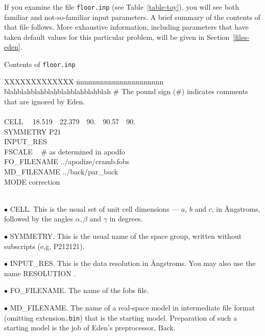 \documentclass{report}
\begin{document}
If you examine the file {\tt floor.inp} (see Table~\ref{table-toy}), 
you will see both familiar and
not-so-familiar input parameters.  A brief summary of the
contents of that file follows.  More exhaustive information, 
including parameters that have taken default
values for this particular problem, will be given in Section~\ref{files-eden}.

\begin{table} [htb]
\caption {\large Contents of {\tt floor.inp}}
\label{table-toy}

\begin{tabbing}
XXXXXXXXXXXXX \= nnnnnnnnnnnnnnnnnnnnnn \=
blahblahblahblahblahblahblahblah \kill
\#  The pound sign (\#) indicates comments that are ignored by Eden. \\
\\
CELL ~~18.519~~22.379~~90.~~90.57~~90. \\
SYMMETRY \> P21 \\
INPUT\_RES  \\
FSCALE       ~	\# as determined in apodfo \\
FO\_FILENAME \> ../apodize/cramb.fobs  \\
MD\_FILENAME \> ../back/par\_back  \\
MODE \> correction \\
\\
\end{tabbing} 
\end{table}

\vspace {0.1in}

$\bullet$ CELL. This is the usual set 
of unit cell dimensions --- $a$, $b$ and 
$c$, in \AA ngstroms, followed by the angles $\alpha, \beta$ 
and $\gamma$ in degrees.  

$\bullet$ SYMMETRY.
This is the usual name of the space group, written without subscripts (e,g,
P212121).

$\bullet$ INPUT\_RES.  
This is the data 
resolution in \AA ngstroms.  You may also use the name
RESOLUTION .

$\bullet$ FO\_FILENAME.  The name 
of the fobs file.

$\bullet$ MD\_FILENAME.
The name of a real-space model in intermediate file format 
(omitting extension{\tt .bin}) that is the starting model. Preparation of such 
a starting model is the job of Eden's preprocessor, Back.
\end{document}
